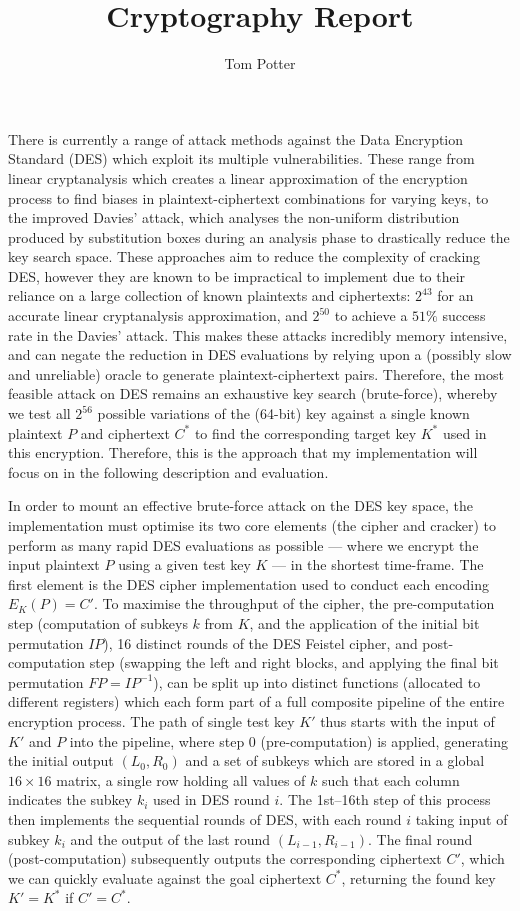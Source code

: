 \documentclass[a4paper, 11pt]{article}
\title{Cryptography Report}
\author{Tom Potter}
\date{}
\begin{document}
\maketitle

There is currently a range of attack methods against the Data Encryption Standard (DES) which exploit its multiple vulnerabilities. These range from linear cryptanalysis which creates a linear approximation of the encryption process to find biases in plaintext-ciphertext combinations for varying keys, to the improved Davies' attack, which analyses the non-uniform distribution produced by substitution boxes during an analysis phase to drastically reduce the key search space. These approaches aim to reduce the complexity of cracking DES, however they are known to be impractical to implement due to their reliance on a large collection of known plaintexts and ciphertexts: $2^{43}$ for an accurate linear cryptanalysis approximation, and $2^{50}$ to achieve a $51\%$ success rate in the Davies' attack. This makes these attacks incredibly memory intensive, and can negate the reduction in DES evaluations by relying upon a (possibly slow and unreliable) oracle to generate plaintext-ciphertext pairs. Therefore, the most feasible attack on DES remains an exhaustive key search (brute-force), whereby we test all $2^{56}$ possible variations of the (64-bit) key against a single known plaintext $P$ and ciphertext $C^{*}$ to find the corresponding target key $K^{*}$ used in this encryption. Therefore, this is the approach that my implementation will focus on in the following description and evaluation.

In order to mount an effective brute-force attack on the DES key space, the implementation must optimise its two core elements (the cipher and cracker) to perform as many rapid DES evaluations as possible --- where we encrypt the input plaintext $P$ using a given test key $K$ --- in the shortest time-frame. The first element is the DES cipher implementation used to conduct each encoding $E_{K}(P) = C'$. To maximise the throughput of the cipher, the pre-computation step (computation of subkeys $k$ from $K$, and the application of the initial bit permutation $IP$), 16 distinct rounds of the DES Feistel cipher, and post-computation step (swapping the left and right blocks, and applying the final bit permutation $FP=IP^{-1}$), can be split up into distinct functions (allocated to different registers) which each form part of a full composite pipeline of the entire encryption process. The path of single test key $K'$ thus starts with the input of $K'$ and $P$ into the pipeline, where step 0 (pre-computation) is applied, generating the initial output $(L_{0}, R_{0})$ and a set of subkeys which are stored in a global $16 \times 16$ matrix, a single row holding all values of $k$ such that each column indicates the subkey $k_i$ used in DES round $i$. The 1st--16th step of this process then implements the sequential rounds of DES, with each round $i$ taking input of subkey $k_i$ and the output of the last round $(L_{i-1}, R_{i-1})$. The final round (post-computation) subsequently outputs the corresponding ciphertext $C'$, which we can quickly evaluate against the goal ciphertext $C^{*}$, returning the found key $K' = K^{*}$ if $C' = C^{*}$.
\end{document}
